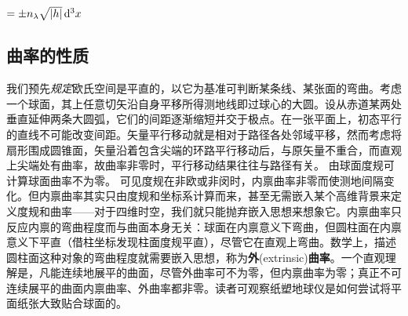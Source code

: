 $=\pm n_\lambda \sqrt{|h|}\dd[3]{x}$


\subsection{曲率的性质}\label{sec:curvature}

我们预先\emph{规定}欧氏空间是平直的，以它为基准可判断某条线、某张面的弯曲。考虑一个球面，其上任意切矢沿自身平移所得测地线即过球心的大圆。设从赤道某两处垂直延伸两条大圆弧，它们的间距逐渐缩短并交于极点。在一张平面上，初态平行的直线不可能改变间距。矢量平行移动就是相对于路径各处邻域平移，然而考虑将扇形围成圆锥面，矢量沿着包含尖端的环路平行移动后，与原矢量不重合，而直观上尖端处有曲率，故曲率非零时，平行移动结果往往与路径有关。
由球面度规可计算球面曲率不为零。
可见度规在非欧或非闵时，内禀曲率非零而使测地间隔变化。但内禀曲率其实只由度规和坐标系计算而来，甚至无需嵌入某个高维背景来定义度规和曲率——对于四维时空，我们就只能抛弃嵌入思想来想象它。内禀曲率只反应内禀的弯曲程度而与曲面本身无关：球面在内禀意义下弯曲，但圆柱面在内禀意义下平直（借柱坐标发现柱面度规平直），尽管它在直观上弯曲。数学上，描述圆柱面这种对象的弯曲程度就需要嵌入思想，称为\textbf{外}(extrinsic)\textbf{曲率}。一个直观理解是，凡能连续地展平的曲面，尽管外曲率可不为零，但内禀曲率为零；真正不可连续展平的曲面内禀曲率、外曲率都非零。读者可观察纸塑地球仪是如何尝试将平面纸张大致贴合球面的。

